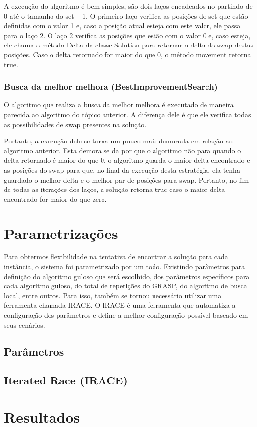 \documentclass[12pt]{article}
\begin{document}
A execução do algoritmo é bem simples, são dois laços encadeados no partindo de 0 até o tamanho do set – 1. O primeiro laço verifica as posições do set que estão definidas com o valor 1 e, caso a posição atual esteja com este valor, ele passa para o laço 2. O laço 2 verifica as posições que estão com o valor 0 e, caso esteja, ele chama o método Delta da classe Solution para retornar o delta do swap destas posições. Caso o delta retornado for maior do que 0, o método movement retorna true.

\subsubsection{Busca da melhor melhora (BestImprovementSearch)}\label{bis}
O algoritmo que realiza a busca da melhor melhora é executado de maneira parecida ao algoritmo do tópico anterior. A diferença dele é que ele verifica todas as possibilidades de swap presentes na solução. 

Portanto, a execução dele se torna um pouco mais demorada em relação ao algoritmo anterior. Esta demora se da por que o algoritmo não para quando o delta retornado é maior do que 0, o algoritmo guarda o maior delta encontrado e as posições do swap para que, no final da execução desta estratégia, ela tenha guardado o melhor delta e o melhor par de posições para swap. Portanto, no fim de todas as iterações dos laços, a solução retorna true caso o maior delta encontrado for maior do que zero.

\section{Parametrizações}
Para obtermos flexibilidade na tentativa de encontrar a solução para cada instância, o sistema foi parametrizado por um todo. Existindo parâmetros para definição do algoritmo guloso que será escolhido, dos parâmetros específicos para cada algoritmo guloso, do total de repetições do GRASP, do algoritmo de busca local, entre outros.
Para isso, também se tornou necessário utilizar uma ferramenta chamada IRACE. O IRACE é uma ferramenta que automatiza a configuração dos parâmetros e define a melhor configuração possível baseado em seus cenários.

\subsection{Parâmetros}
\subsection{Iterated Race (IRACE)}


\section{Resultados}







\end{document}
